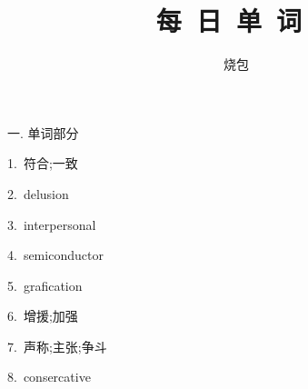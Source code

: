 \documentclass[a4paper, 12pt]{article}
\begin{document}
    \noindent

    \title{每\ 日\ 单\ 词\ }
    \author{烧包}
    \maketitle

\begin{flushleft}
一. 单词部分
\end{flushleft}

\begin{multicols}{2}
\begin{flushleft}
1.\ 符合;一致 \ \ \ \ \underline{\hspace{3cm}}
\end{flushleft}

\begin{flushleft}
2.\ delusion \ \ \ \ \underline{\hspace{3cm}}
\end{flushleft}
\end{multicols}

\begin{multicols}{2}
\begin{flushleft}
3.\ interpersonal \ \ \ \ \underline{\hspace{3cm}}
\end{flushleft}

\begin{flushleft}
4.\ semiconductor \ \ \ \ \underline{\hspace{3cm}}
\end{flushleft}
\end{multicols}

\begin{multicols}{2}
\begin{flushleft}
5.\ grafication \ \ \ \ \underline{\hspace{3cm}}
\end{flushleft}

\begin{flushleft}
6.\ 增援;加强 \ \ \ \ \underline{\hspace{3cm}}
\end{flushleft}
\end{multicols}

\begin{multicols}{2}
\begin{flushleft}
7.\ 声称;主张;争斗 \ \ \ \ \underline{\hspace{3cm}}
\end{flushleft}

\begin{flushleft}
8.\ consercative \ \ \ \ \underline{\hspace{3cm}}
\end{flushleft}
\end{multicols}
\end{document}

